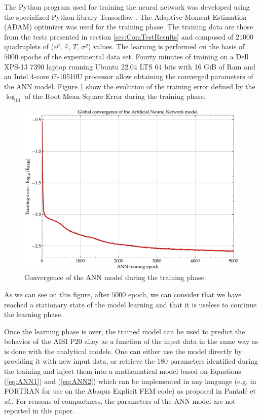 \documentclass[twoside,english,1p,final,sort&compress]{elsarticle}
\makeatletter
\theoremstyle{plain}
\newcommand{\mdot}[1]{\accentset{\mbox{\bfseries .}}{#1}}
\newcommand*{\eal}{et \emph{al.}\@\xspace}
\makeatother
\begin{document}
The Python program used for training the neural network was developed using the specialized Python library Tensorflow \cite{Abadi-2016}.
The Adaptive Moment Estimation (ADAM) optimizer \cite{Kingma-2015} was used for the training phase.
The training data are those from the tests presented in section \ref{sec:ComTestResults} and composed of $21000$ quadruplets of ($\varepsilon^p$, $\mdot\varepsilon$, $T$, $\sigma^y$) values.
The learning is performed on the basis of $5000$ epochs of the experimental data set.
Fourty minutes of training on a Dell XPS-13 7390 laptop running Ubuntu 22.04 LTS 64 bits with 16 GiB of Ram and an Intel 4-core i7-10510U processor allow obtaining the converged parameters of the ANN model.
Figure \ref{fig:ANN-6-conv} show the evolution of the training error defined by the $\log_{10}$ of the Root Mean Square Error during the training phase.
\begin{figure}[!ht]
\centering
\includegraphics[width=0.7\columnwidth]
{Figures/Conv-ANN-6}
\caption{Convergence of the ANN model during the training phase.}
\label{fig:ANN-6-conv}
\end{figure}
As we can see on this figure, after $5000$ epoch, we can consider that we have reached a stationary state of the model learning and that it is useless to continue the learning phase.

Once the learning phase is over, the trained model can be used to predict the behavior of the AISI P20 alloy as a function of the input data in the same way as is done with the analytical models.
One can either use the model directly by providing it with new input data, or retrieve the $180$ parameters identified during the training and inject them into a mathematical model based on Equations (\ref{eq:ANN1}) and (\ref{eq:ANN2}) which can be implemented in any language (e.g. in FORTRAN for use on the Abaqus Explicit FEM code) as proposed in Pantalé \eal \cite{Pantale-2021}.
For reasons of compactness, the parameters of the ANN model are not reported in this paper.
\end{document}

